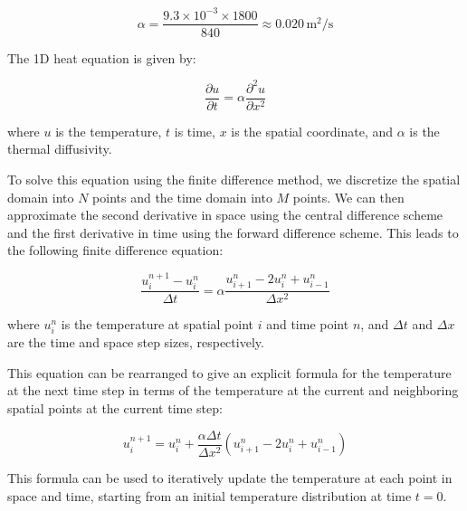 \documentclass{optica-article}
\begin{document}
	\begin{equation}
		\alpha = \frac{9.3 \times 10^{-3} \times 1800}{ 840} \approx 0.020 \, \text{m}^2/\text{s}
	\end{equation}

The 1D heat equation is given by:

\begin{equation}
\frac{\partial u}{\partial t} = \alpha \frac{\partial^2 u}{\partial x^2}
\end{equation}

where $u$ is the temperature, $t$ is time, $x$ is the spatial coordinate, 
and $\alpha$ is the thermal diffusivity.



To solve this equation using the finite difference method, we discretize 
the spatial domain into $N$ points and the time domain into $M$ points. 
We can then approximate the second derivative in space using the central 
difference scheme and the first derivative in time using the forward difference
 scheme. This leads to the following finite difference equation:

\begin{equation}
\frac{u_i^{n+1} - u_i^n}{\Delta t} = \alpha \frac{u_{i+1}^n - 2u_i^n + u_{i-1}^n}{\Delta x^2}
\end{equation}

where $u_i^n$ is the temperature at spatial point $i$ and time point $n$, 
and $\Delta t$ and $\Delta x$ are the time and space step sizes, respectively.

This equation can be rearranged to give an explicit formula for the temperature 
at the next time step in terms of the temperature at the current and 
neighboring spatial points at the current time step:

\begin{equation}
u_i^{n+1} = u_i^n + \frac{\alpha \Delta t}{\Delta x^2} (u_{i+1}^n - 2u_i^n + u_{i-1}^n)
\end{equation}

This formula can be used to iteratively update the temperature at each point 
in space and time, starting from an initial temperature distribution at 
time $t=0$.
\end{document}
